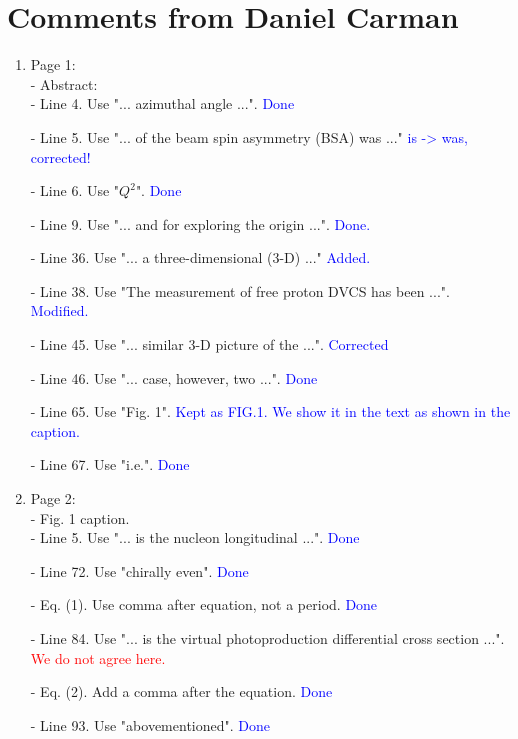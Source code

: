 \documentclass[a4paper,11pt,twoside]{article}
\date{\today}
\begin{document}
\section{Comments from Daniel Carman}

\begin{enumerate}

\item Page 1:\\
 - Abstract:\\
   - Line 4. Use "... azimuthal angle ...".
   \textcolor{blue}{Done} 

   - Line 5. Use "... of the beam spin asymmetry (BSA) was ..."
   \textcolor{blue}{is -> was, corrected!}

   - Line 6. Use "$Q^2$".
   \textcolor{blue}{Done}

   - Line 9. Use "... and for exploring the origin ...".
   \textcolor{blue}{Done.}

 - Line 36. Use "... a three-dimensional (3-D) ..."
   \textcolor{blue}{Added.}

 - Line 38. Use "The measurement of free proton DVCS has been ...".
   \textcolor{blue}{Modified.}

 - Line 45. Use "... similar 3-D picture of the ...".
   \textcolor{blue}{Corrected}

 - Line 46. Use "... case, however, two ...".
   \textcolor{blue}{Done}

 - Line 65. Use "Fig. 1".
   \textcolor{blue}{Kept as FIG.1. We show it in the text as shown in the 
      caption.}

 - Line 67. Use "i.e.".
   \textcolor{blue}{Done}
~\\
\item Page 2:\\
 - Fig. 1 caption.\\
   - Line 5. Use "... is the nucleon longitudinal ...".
   \textcolor{blue}{Done}

 - Line 72. Use "chirally even".
   \textcolor{blue}{Done}

 - Eq. (1). Use comma after equation, not a period.
   \textcolor{blue}{Done}

 - Line 84. Use "... is the virtual photoproduction differential cross section 
      ...".
   \textcolor{red}{We do not agree here.}

 - Eq. (2). Add a comma after the equation.
   \textcolor{blue}{Done}
 
 - Line 93. Use "abovementioned".
   \textcolor{blue}{Done}
 

\end{enumerate}
\end{document}
